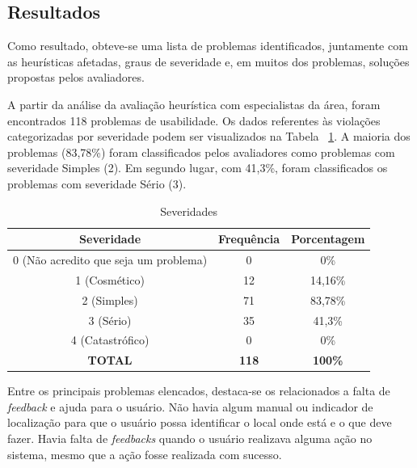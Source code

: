 \subsection{Resultados}

Como resultado, obteve-se uma lista de problemas identificados, juntamente com as heurísticas afetadas, graus de severidade e, em muitos dos problemas, soluções propostas pelos avaliadores.

A partir da análise da avaliação heurística com especialistas da área, foram encontrados 118 problemas de usabilidade. Os dados referentes às violações categorizadas por severidade podem ser visualizados na Tabela ~\ref{tab:severidade}. A maioria dos problemas (83,78\%) foram classificados pelos avaliadores como problemas com severidade Simples (2). Em segundo lugar, com 41,3\%, foram classificados os problemas com severidade Sério (3). 

\begin{table}[H]
\centering
\caption{Severidades}
\label{tab:severidade}
\begin{tabular}{c|c|c}
      \hline
       \rowcolor[gray]{.9}
      \bf Severidade  & \bf Frequência & \bf Porcentagem  \\
      \hline
      \hline
0 (Não acredito que seja um problema) & 0          & 0\%         \\
1 (Cosmético)                        & 12         & 14,16\%     \\
2 (Simples)                          & 71         & 83,78\%     \\
3 (Sério)                           & 35         & 41,3\%      \\
4 (Catastrófico)                     & 0          & 0\%         \\

\hline
\hline
\bf TOTAL   & \bf 118        & \bf 100\%   \\
 \hline 
\end{tabular}
\end{table}



Entre os principais problemas elencados, destaca-se os relacionados a falta de \textit{feedback} e ajuda para o usuário. Não havia algum manual ou indicador de localização para que o usuário possa identificar o local onde está e o que deve fazer. Havia falta de \textit{feedbacks} quando o usuário realizava alguma ação no sistema, mesmo que a ação fosse realizada com sucesso. 

